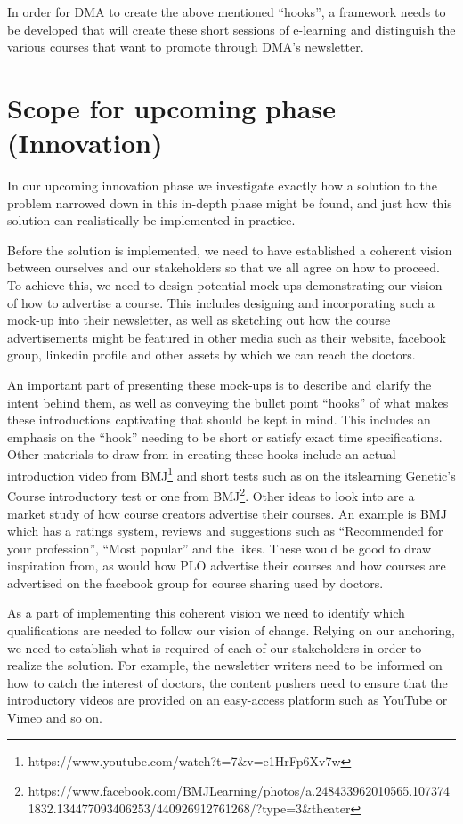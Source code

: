 In order for DMA to create the above mentioned “hooks”, a framework needs to be developed that will create these short sessions of e-learning and distinguish the various courses that want to promote through DMA’s newsletter.

\section{Scope for upcoming phase (Innovation)}
In our upcoming innovation phase we investigate exactly how a solution to the problem narrowed down in this in-depth phase might be found, and just how this solution can realistically be implemented in practice.

Before the solution is implemented, we need to have established a coherent vision between ourselves and our stakeholders so that we all agree on how to proceed. To achieve this, we need to design potential mock-ups demonstrating our vision of how to advertise a course. This includes designing and incorporating such a mock-up into their newsletter, as well as sketching out how the course advertisements might be featured in other media such as their website, facebook group, linkedin profile and other assets by which we can reach the doctors.

An important part of presenting these mock-ups is to describe and clarify the intent behind them, as well as conveying the bullet point “hooks” of what makes these introductions captivating that should be kept in mind. This includes an emphasis on the “hook” needing to be short or satisfy exact time specifications. Other materials to draw from in creating these hooks include an actual introduction video from BMJ\footnote{https://www.youtube.com/watch?t=7\&v=e1HrFp6Xv7w} and short tests such as on the itslearning Genetic’s Course introductory test or one from BMJ\footnote{https://www.facebook.com/BMJLearning/photos/a.248433962010565.1073741832.134477093406253/440926912761268/?type=3\&theater}. Other ideas to look into are a market study of how course creators advertise their courses. An example is BMJ which has a ratings system, reviews and suggestions such as “Recommended for your profession”, “Most popular” and the likes. These would be good to draw inspiration from, as would how PLO advertise their courses and how courses are advertised on the facebook group for course sharing used by doctors.

As a part of implementing this coherent vision we need to identify which qualifications are needed to follow our vision of change. Relying on our anchoring, we need to establish what is required of each of our stakeholders in order to realize the solution. For example, the newsletter writers need to be informed on how to catch the interest of doctors, the content pushers need to ensure that the introductory videos are provided on an easy-access platform such as YouTube or Vimeo and so on.

